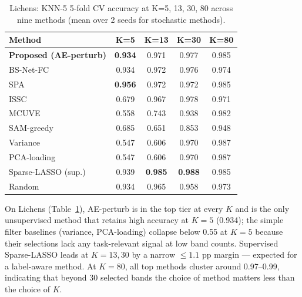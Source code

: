 \begin{table}[!t]
\centering
\caption{Lichens: KNN-5 5-fold CV accuracy at K=5, 13, 30, 80 across nine methods (mean over 2 seeds for stochastic methods).}
\label{tab:sota_lichens}
\begin{tabular}{@{}lcccc@{}}
\toprule
\textbf{Method} & \textbf{K=5} & \textbf{K=13} & \textbf{K=30} & \textbf{K=80} \\
\midrule
\textbf{Proposed (AE-perturb)} & \textbf{0.934} & 0.971 & 0.977 & 0.985 \\
\midrule
BS-Net-FC~\cite{cai2020bsnet} & 0.934 & 0.972 & 0.976 & 0.974 \\
SPA~\cite{araujo2001spa} & \textbf{0.956} & 0.972 & 0.972 & 0.985 \\
ISSC~\cite{elhamifar2013ssc} & 0.679 & 0.967 & 0.978 & 0.971 \\
MCUVE~\cite{centner1996mcuve} & 0.558 & 0.743 & 0.938 & 0.982 \\
SAM-greedy & 0.685 & 0.651 & 0.853 & 0.948 \\
Variance & 0.547 & 0.606 & 0.970 & 0.987 \\
PCA-loading & 0.547 & 0.606 & 0.970 & 0.987 \\
Sparse-LASSO (sup.) & 0.939 & \textbf{0.985} & \textbf{0.988} & 0.985 \\
Random & 0.934 & 0.965 & 0.958 & 0.973 \\
\bottomrule
\end{tabular}
\end{table}

On Lichens (Table~\ref{tab:sota_lichens}), AE-perturb is in the top tier at every $K$ and is the only unsupervised method that retains high accuracy at $K=5$ (0.934); the simple filter baselines (variance, PCA-loading) collapse below 0.55 at $K=5$ because their selections lack any task-relevant signal at low band counts. Supervised Sparse-LASSO leads at $K=13, 30$ by a narrow $\leq 1.1$ pp margin --- expected for a label-aware method. At $K=80$, all top methods cluster around 0.97--0.99, indicating that beyond 30 selected bands the choice of method matters less than the choice of $K$.

